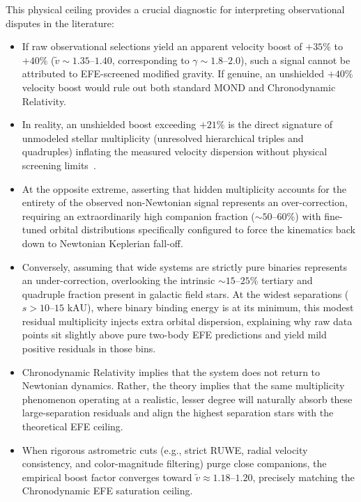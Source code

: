\documentclass[aps,prd,reprint,superscriptaddress,nofootinbib,floatfix,amsmath,amssymb]{revtex4-2}
\begin{document}
This physical ceiling provides a crucial diagnostic for interpreting observational disputes in the literature:
\begin{itemize}
\item If raw observational selections yield an apparent velocity boost of $+35\%$ to $+40\%$ ($\tilde{v} \sim 1.35\text{--}1.40$, corresponding to $\gamma \sim 1.8\text{--}2.0$), such a signal cannot be attributed to EFE-screened modified gravity. If genuine, an unshielded $+40\%$ velocity boost would rule out both standard MOND and Chronodynamic Relativity.
\item In reality, an unshielded boost exceeding $+21\%$ is the direct signature of unmodeled stellar multiplicity (unresolved hierarchical triples and quadruples) inflating the measured velocity dispersion without physical screening limits~\cite{pittordis2023testing,banik2024strong}.
\item At the opposite extreme, asserting that hidden multiplicity accounts for the entirety of the observed non-Newtonian signal represents an over-correction, requiring an extraordinarily high companion fraction ($\sim 50\text{--}60\%$) with fine-tuned orbital distributions specifically configured to force the kinematics back down to Newtonian Keplerian fall-off.
\item Conversely, assuming that wide systems are strictly pure binaries represents an under-correction, overlooking the intrinsic $\sim 15\text{--}25\%$ tertiary and quadruple fraction present in galactic field stars. At the widest separations ($s > 10\text{--}15\text{ kAU}$), where binary binding energy is at its minimum, this modest residual multiplicity injects extra orbital dispersion, explaining why raw data points sit slightly above pure two-body EFE predictions and yield mild positive residuals in those bins.
\item Chronodynamic Relativity implies that the system does not return to Newtonian dynamics. Rather, the theory implies that the same multiplicity phenomenon operating at a realistic, lesser degree will naturally absorb these large-separation residuals and align the highest separation stars with the theoretical EFE ceiling.
\item When rigorous astrometric cuts (e.g., strict RUWE, radial velocity consistency, and color-magnitude filtering) purge close companions, the empirical boost factor converges toward $\tilde{v} \approx 1.18\text{--}1.20$, precisely matching the Chronodynamic EFE saturation ceiling.
\end{itemize}
\end{document}
